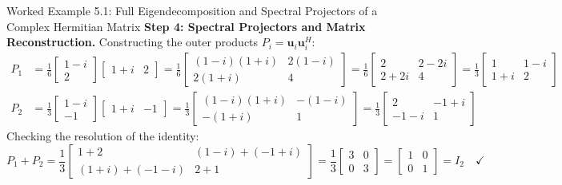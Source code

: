 \begin{examplebox}{Worked Example 5.1: Full Eigendecomposition and Spectral Projectors of a Complex Hermitian Matrix}
\textbf{Step 4: Spectral Projectors and Matrix Reconstruction.}
Constructing the outer products $P_i = \mathbf{u}_i \mathbf{u}_i^H$:
\begin{align}
P_1 &= \frac{1}{6} \begin{bmatrix} 1 - i \\ 2 \end{bmatrix} \begin{bmatrix} 1 + i & 2 \end{bmatrix} = \frac{1}{6} \begin{bmatrix} (1 - i)(1 + i) & 2(1 - i) \\ 2(1 + i) & 4 \end{bmatrix} = \frac{1}{6} \begin{bmatrix} 2 & 2 - 2i \\ 2 + 2i & 4 \end{bmatrix} = \frac{1}{3} \begin{bmatrix} 1 & 1 - i \\ 1 + i & 2 \end{bmatrix} \\
P_2 &= \frac{1}{3} \begin{bmatrix} 1 - i \\ -1 \end{bmatrix} \begin{bmatrix} 1 + i & -1 \end{bmatrix} = \frac{1}{3} \begin{bmatrix} (1 - i)(1 + i) & -(1 - i) \\ -(1 + i) & 1 \end{bmatrix} = \frac{1}{3} \begin{bmatrix} 2 & -1 + i \\ -1 - i & 1 \end{bmatrix}
\end{align}
Checking the resolution of the identity:
\begin{equation}
P_1 + P_2 = \frac{1}{3} \begin{bmatrix} 1 + 2 & (1 - i) + (-1 + i) \\ (1 + i) + (-1 - i) & 2 + 1 \end{bmatrix} = \frac{1}{3} \begin{bmatrix} 3 & 0 \\ 0 & 3 \end{bmatrix} = \begin{bmatrix} 1 & 0 \\ 0 & 1 \end{bmatrix} = I_2 \quad \checkmark
\end{equation}

\end{examplebox}
